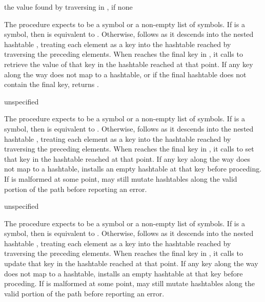 \begin{procedure}
\end{procedure}
\returns{} the value found by traversing  in ,
 if none

The  procedure expects  to be a symbol or
a non-empty list of symbols.
If  is a symbol, then  is equivalent
to .
Otherwise,  follows  as it descends into
the nested hashtable , treating each element as a key into
the hashtable reached by traversing the preceding elements.
When  reaches the final key in ,
it calls  to retrieve the value of that key
in the hashtable reached at that point.
If any key along the way does not map to a hashtable,
or if the final hashtable does not contain the final key,
 returns .

\begin{procedure}
\end{procedure}
\returns{} unspecified

The  procedure expects  to be a symbol or
a non-empty list of symbols.
If  is a symbol, then  is equivalent
to .
Otherwise,  follows  as it descends into
the nested hashtable , treating each element as a key into
the hashtable reached by traversing the preceding elements.
When  reaches the final key in ,
it calls  to set that key in the
hashtable reached at that point.
If any key along the way does not map to a hashtable,
 installs an empty hashtable at that key
before proceding.
If  is malformed at some point,  may
still mutate hashtables along the valid portion of the path
before reporting an error.

\begin{procedure}
\end{procedure}
\returns{} unspecified

The  procedure expects  to be a symbol or
a non-empty list of symbols.
If  is a symbol, then  is equivalent
to .
Otherwise,  follows  as it descends into
the nested hashtable , treating each element as a key into
the hashtable reached by traversing the preceding elements.
When  reaches the final key in ,
it calls  to update that key in the
hashtable reached at that point.
If any key along the way does not map to a hashtable,
 installs an empty hashtable at that key
before proceding.
If  is malformed at some point,  may
still mutate hashtables along the valid portion of the path
before reporting an error.

